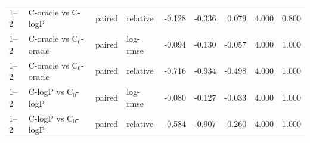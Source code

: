 \begin{longtable}{llllrrrrr}
1–2 & C-oracle vs C-logP & paired & relative & -0.128 & -0.336 & 0.079 & 4.000 & 0.800 \\
1–2 & C-oracle vs C$_0$-oracle & paired & log-rmse & -0.094 & -0.130 & -0.057 & 4.000 & 1.000 \\
1–2 & C-oracle vs C$_0$-oracle & paired & relative & -0.716 & -0.934 & -0.498 & 4.000 & 1.000 \\
1–2 & C-logP vs C$_0$-logP & paired & log-rmse & -0.080 & -0.127 & -0.033 & 4.000 & 1.000 \\
1–2 & C-logP vs C$_0$-logP & paired & relative & -0.584 & -0.907 & -0.260 & 4.000 & 1.000 \\
\end{longtable}
\endgroup
